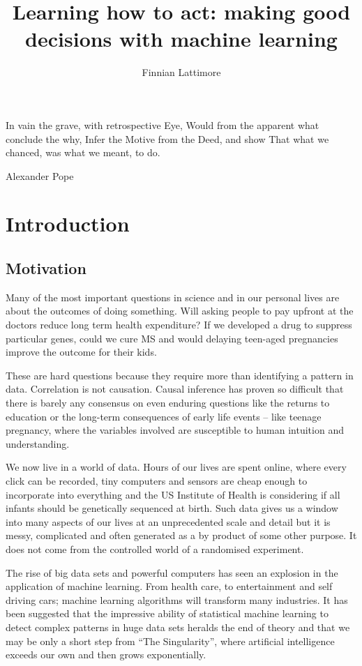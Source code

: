 \documentclass[11pt,a4paper,oneside]{book}
\author{Finnian Lattimore}
\title{Learning how to act: making good decisions with machine learning}
\newcommand{\quotes}[1]{``#1''}
\theoremstyle{plain}
\theoremstyle{definition}
\newcommand{\ci}{\mathrel{\perp\mspace{-10mu}\perp}}
\begin{document}


\maketitle

\epigraph{In vain the grave, with retrospective Eye,
Would from the apparent what conclude the why,
Infer the Motive from the Deed, and show
That what we chanced, was what we meant, to do.}{Alexander Pope}

\tableofcontents


\chapter{Introduction}


\section{Motivation}
Many of the most important questions in science and in our personal lives are about the outcomes of doing something. Will asking people to pay upfront at the doctors reduce long term health expenditure? If we developed a drug to suppress particular genes, could we cure MS and would delaying teen-aged pregnancies improve the outcome for their kids.  

These are hard questions because they require more than identifying a pattern in data. Correlation is not causation. Causal inference has proven so difficult that there is barely any consensus on even enduring questions like the returns to education or the long-term consequences of early life events – like teenage pregnancy, where the variables involved are susceptible to human intuition and understanding. 

We now live in a world of data. Hours of our lives are spent online, where every click can be recorded, tiny computers and sensors are cheap enough to incorporate into everything and the US Institute of Health is considering if all infants should be genetically sequenced at birth. Such data gives us a window into many aspects of our lives at an unprecedented scale and detail but it is messy, complicated and often generated as a by product of some other purpose. It does not come from the controlled world of a randomised experiment.

The rise of big data sets and powerful computers has seen an explosion in the application of machine learning. From health care, to entertainment and self driving cars; machine learning algorithms will transform many industries. It has been suggested that the impressive ability of statistical machine learning to detect complex patterns in huge data sets heralds the end of theory \citep{anderson2008end} and that we may be only a short step from \quotes{The Singularity}, where artificial intelligence exceeds our own and then grows exponentially. 
\end{document}
